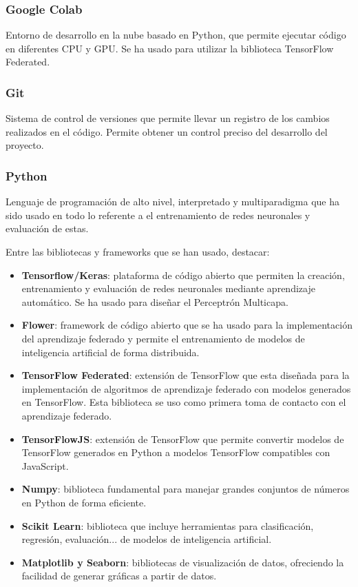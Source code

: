 \subsubsection{Google Colab}
\label{subsubsec:colab}
Entorno de desarrollo en la nube basado en Python, que permite ejecutar código en diferentes CPU y GPU. Se ha usado para utilizar la biblioteca TensorFlow Federated.

\subsubsection{Git}
\label{subsubsec:git}
Sistema de control de versiones que permite llevar un registro de los cambios realizados en el código. Permite obtener un control preciso del desarrollo del proyecto. 

\subsubsection{Python}
\label{subsubsec:python}
Lenguaje de programación de alto nivel, interpretado y multiparadigma que ha sido usado en todo lo referente a el entrenamiento de redes neuronales y evaluación de estas.

Entre las bibliotecas y frameworks que se han usado, destacar:
\begin{itemize}
    \item \textbf{Tensorflow/Keras}: plataforma de código abierto que permiten la creación, entrenamiento y evaluación de redes neuronales mediante aprendizaje automático. Se ha usado para diseñar el Perceptrón Multicapa.
    \item \textbf{Flower}: framework de código abierto que se ha usado para la implementación del aprendizaje federado y permite el entrenamiento de modelos de inteligencia artificial de forma distribuida.
    \item \textbf{TensorFlow Federated}: extensión de TensorFlow que esta diseñada para la implementación de algoritmos de aprendizaje federado con modelos generados en TensorFlow. Esta biblioteca se uso como primera toma de contacto con el aprendizaje federado.
    \item \textbf{TensorFlowJS}: extensión de TensorFlow que permite convertir modelos de TensorFlow generados en Python a modelos TensorFlow compatibles con JavaScript.
    \item \textbf{Numpy}: biblioteca fundamental para manejar grandes conjuntos de números en Python de forma eficiente.
    \item \textbf{Scikit Learn}: biblioteca que incluye herramientas para clasificación, regresión, evaluación... de modelos de inteligencia artificial.
    \item \textbf{Matplotlib y Seaborn}: bibliotecas de visualización de datos, ofreciendo la facilidad de generar gráficas a partir de datos.
\end{itemize}

